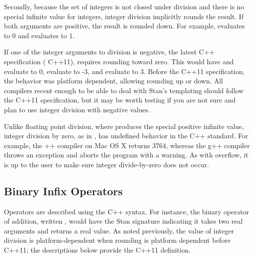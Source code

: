 Secondly, because the set of integers is not closed under division and there is no special infinite value for integers, integer division implicitly rounds the result.  If both arguments are positive, the result is rounded down.  For example,  evaluates to 0 and  evaluates to 1.


If one of the integer arguments to division is negative, the latest  C++ specification ( C++11), requires rounding toward zero.  This would have  and  evaluate to 0,  evaluate to -3, and  evaluate to 3.  Before the  C++11 specification, the behavior was platform dependent, allowing rounding up or down.  All compilers recent enough to be able to deal with Stan's templating should follow the  C++11 specification, but it may be worth testing if you are not sure and plan to use integer division with negative values.


Unlike floating point division, where  produces the special positive infinite value, integer division by zero, as in , has undefined behavior in the  C++ standard.  For example, the \clang++ compiler on Mac OS X returns 3764, whereas the g++ compiler throws an exception and aborts the program with a warning.  As with overflow, it is up to the user to make sure integer divide-by-zero does not occur.


\subsection{Binary Infix Operators}


Operators are described using the  C++ syntax.  For instance, the binary operator of addition, written , would have the Stan signature  indicating it takes two real arguments and returns a real value.  As noted previously, the value of integer division is platform-dependent when rounding is platform dependent before C++11;  the descriptions below provide the C++11 definition.


